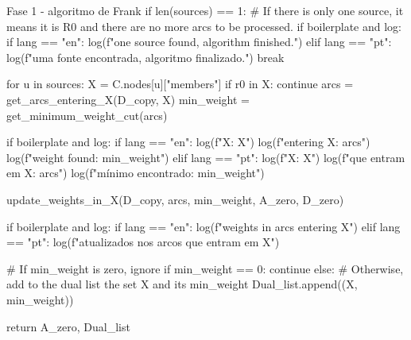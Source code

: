 \documentclass[12pt,a4paper]{article}
\begin{document}
\begin{pybox}{Fase 1 - algoritmo de Frank}
        if len(sources) == 1:
            # If there is only one source, it means it is R0 and there are no more arcs to be processed.
            if boilerplate and log:
                if lang == "en":
                    log(f"\nOnly one source found, algorithm finished.")
                elif lang == "pt":
                    log(f"\nApenas uma fonte encontrada, algoritmo finalizado.")
            break

        for u in sources:
            X = C.nodes[u]["members"]
            if r0 in X:
                continue
            arcs = get_arcs_entering_X(D_copy, X)
            min_weight = get_minimum_weight_cut(arcs)

            if boilerplate and log:
                if lang == "en":
                    log(f"\nSet X: {X}")
                    log(f"\nArcs entering X: {arcs}")
                    log(f"\nMinimum weight found: {min_weight}")
                elif lang == "pt":
                    log(f"\nConjunto X: {X}")
                    log(f"\nArestas que entram em X: {arcs}")
                    log(f"\nPeso mínimo encontrado: {min_weight}")

            update_weights_in_X(D_copy, arcs, min_weight, A_zero, D_zero)

            if boilerplate and log:
                if lang == "en":
                    log(f"\nUpdated weights in arcs entering X")
                elif lang == "pt":
                    log(f"\nPesos atualizados nos arcos que entram em X")

            # If min_weight is zero, ignore
            if min_weight == 0:
                continue
            else:
                # Otherwise, add to the dual list the set X and its min_weight
                Dual_list.append((X, min_weight))

    return A_zero, Dual_list
\end{pybox}
\end{document}
